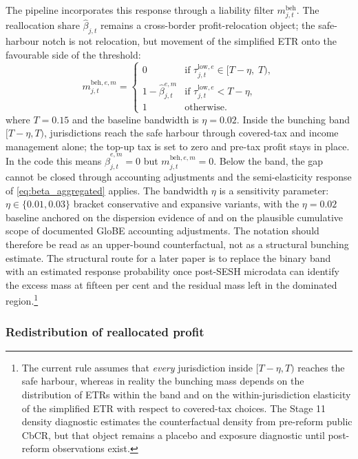 \documentclass[11pt,a4paper]{article}
\begin{document}
The pipeline incorporates this response through a liability filter $m_{j,t}^{\text{beh}}$. The reallocation share $\hat{\beta}_{j,t}$ remains a cross-border profit-relocation object; the safe-harbour notch is not relocation, but movement of the simplified ETR onto the favourable side of the threshold:
\begin{equation}\label{eq:regime}
m_{j,t}^{\text{beh},e,m} = \begin{cases}
0 & \text{if } \tau_{j,t}^{\text{low},e} \in [T - \eta,\; T), \\[2pt]
1-\hat{\beta}_{j,t}^{e,m} & \text{if } \tau_{j,t}^{\text{low},e} < T - \eta, \\[2pt]
1 & \text{otherwise.}
\end{cases}
\end{equation}
where $T = 0.15$ and the baseline bandwidth is $\eta = 0.02$. Inside the bunching band $[T-\eta, T)$, jurisdictions reach the safe harbour through covered-tax and income management alone; the top-up tax is set to zero and pre-tax profit stays in place. In the code this means $\hat{\beta}_{j,t}^{e,m}=0$ but $m_{j,t}^{\text{beh},e,m}=0$. Below the band, the gap cannot be closed through accounting adjustments and the semi-elasticity response of \eqref{eq:beta_aggregated} applies. The bandwidth $\eta$ is a sensitivity parameter: $\eta \in \{0.01, 0.03\}$ bracket conservative and expansive variants, with the $\eta = 0.02$ baseline anchored on the dispersion evidence of \citet{hugger2026} and on the plausible cumulative scope of documented GloBE accounting adjustments. The notation should therefore be read as an upper-bound counterfactual, not as a structural bunching estimate. The structural route for a later paper is to replace the binary band with an estimated response probability once post-SESH microdata can identify the excess mass at fifteen per cent and the residual mass left in the dominated region.\footnote{The current rule assumes that \emph{every} jurisdiction inside $[T-\eta,T)$ reaches the safe harbour, whereas in reality the bunching mass depends on the distribution of ETRs within the band and on the within-jurisdiction elasticity of the simplified ETR with respect to covered-tax choices. The Stage 11 density diagnostic estimates the counterfactual density from pre-reform public CbCR, but that object remains a placebo and exposure diagnostic until post-reform observations exist.}

\subsubsection{Redistribution of reallocated profit}\label{sec:reallocation}
\end{document}
